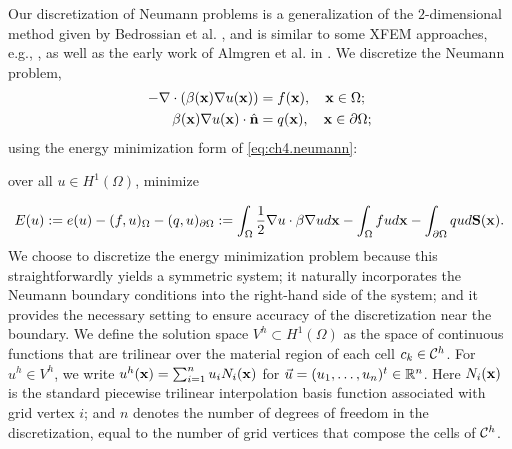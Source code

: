Our discretization of Neumann problems is a generalization of the $2$-dimensional method given by Bedrossian et al. \cite{Bedrossian10}, and is similar to some XFEM approaches, e.g., \cite{Daux00}, as well as the early work of Almgren et al. in \cite{Almgren97}. We discretize the Neumann problem,
\begin{equation} \label{eq:ch4.neumann}
\begin{split}
-\nabla \cdot \left( \beta(\mathbf{x}) \nabla u(\mathbf{x}) \right) & = f(\mathbf{x}), \quad \mathbf{x} \in \Omega; \\
\beta(\mathbf{x}) \nabla u(\mathbf{x}) \cdot \hat{\mathbf{n}} & = q(\mathbf{x}), \quad \mathbf{x} \in \partial\Omega;
\end{split}
\end{equation}
using the energy minimization form of \eqref{eq:ch4.neumann}:
\begin{center}
over all $u \in H^1(\Omega)$, minimize
\end{center}
\begin{equation} \label{eq:ch4.neumann.energy.continuous}
E(u) := e(u) - (f,u)_{\Omega} - (q,u)_{\partial\Omega} := \int_{\Omega} \frac{1}{2} \nabla u \cdot \beta \nabla u d\mathbf{x} - \int_{\Omega} f u d\mathbf{x} - \int_{\partial\Omega} q u d\mathbf{S}(\mathbf{x}).
\end{equation}
We choose to discretize the energy minimization problem because this straightforwardly yields a symmetric system; it naturally incorporates the Neumann boundary conditions into the right-hand side of the system; and it provides the necessary setting to ensure accuracy of the discretization near the boundary. We define the solution space $V^h \subset H^1(\Omega)$ as the space of continuous functions that are trilinear over the material region of each cell $c_k \in \mathcal{C}^h$. For $u^h \in V^h$, we write $u^h(\mathbf{x}) = \sum_{i = 1}^n u_i N_i(\mathbf{x})$ for $\vec{u} = (u_1, \dotsc, u_n)^t \in \mathbb{R}^n$. Here $N_i(\mathbf{x})$ is the standard piecewise trilinear interpolation basis function associated with grid vertex $i$; and $n$ denotes the number of degrees of freedom in the discretization, equal to the number of grid vertices that compose the cells of $\mathcal{C}^h$.

